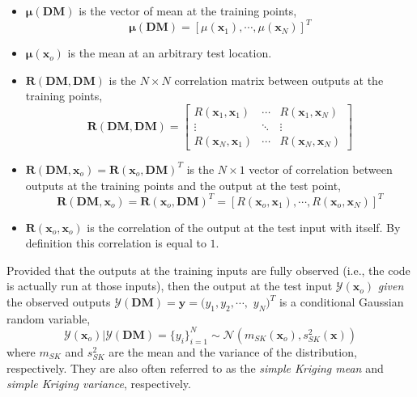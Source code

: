 \begin{itemize}
	\item $\boldsymbol{\mu}(\mathbf{DM})$ is the vector of mean at the training points,
		\begin{equation}
			\boldsymbol{\mu}(\mathbf{DM}) = [\mu(\mathbf{x}_1), \cdots, \mu(\mathbf{x}_N)]^T 
		\label{eq:training_mean_vector}
		\end{equation}
	\item $\boldsymbol{\mu}(\mathbf{x}_o)$ is the mean at an arbitrary test location.
	\item $\mathbf{R}(\mathbf{DM}, \mathbf{DM})$ is the $N \times N$ correlation matrix between outputs at the training points,
		\begin{equation}
			\mathbf{R}(\mathbf{DM}, \mathbf{DM}) = 
				\begin{bmatrix}
					R(\mathbf{x}_1, \mathbf{x}_1)	& \cdots		& R(\mathbf{x}_1, \mathbf{x}_N) \\
					\vdots												& \ddots		&	\vdots \\
					R(\mathbf{x}_N, \mathbf{x}_1)	&	\cdots    & R(\mathbf{x}_N, \mathbf{x}_N)
				\end{bmatrix}
		\label{eq:training_correlation_matrix}
		\end{equation}
	\item $\mathbf{R}(\mathbf{DM}, \mathbf{x}_o) = \mathbf{R}(\mathbf{x}_o, \mathbf{DM})^T$ is the $N \times 1$ vector of correlation between outputs at the training points and the output at the test point,
			\begin{equation}
				\mathbf{R}(\mathbf{DM}, \mathbf{x}_o) = \mathbf{R}(\mathbf{x}_o, \mathbf{DM})^T =  [R(\mathbf{x}_o, \mathbf{x}_1), \cdots, R(\mathbf{x}_o, \mathbf{x}_N)]^T
			\label{eq:training_test_correlation}
			\end{equation}
		\item $\mathbf{R}(\mathbf{x}_o, \mathbf{x}_o)$ is the correlation of the output at the test input with itself. By definition this correlation is equal to $1$.
\end{itemize}

Provided that the outputs at the training inputs are fully observed (i.e., the code is actually run at those inputs),
then the output at the test input $\mathcal{Y}(\mathbf{x}_o)$ \emph{given	} the observed outputs $\mathcal{Y}(\mathbf{DM}) = \mathbf{y} = (y_1, y_2, \cdots,$ 
$y_N)^T$ is a conditional Gaussian random variable,
\begin{equation}
	\mathcal{Y}(\mathbf{x}_o) | \mathcal{Y}(\mathbf{DM}) = \{y_i\}_{i=1}^N \sim \mathcal{N} \left( m_{SK}(\mathbf{x}_o), s^2_{SK}(\mathbf{x})\right)
\label{eq:conditional_training_test}
\end{equation}
where $m_{SK}$ and $s^2_{SK}$ are the mean and the variance of the distribution, respectively.
They are also often referred to as the \emph{simple Kriging mean} and \emph{simple Kriging variance}, respectively.

